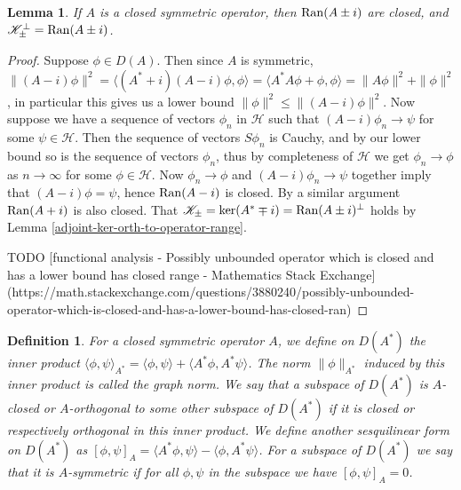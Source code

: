 \documentclass[12pt,oneside]{report}
\newtheorem{lem}[thm]{Lemma}
\newtheorem{defn}[thm]{Definition}
\begin{document}
\begin{lem}\label{RanAplusi-closed}
    If $A$ is a closed symmetric operator, then $\mathrm{Ran}(A\pm i)$ are closed, and $\mathscr{K}_{\pm}^{\perp} = \mathrm{Ran}(A\pm i)$.
\end{lem}
\begin{proof}
    Suppose $\phi \in D(A)$. Then since $A$ is symmetric, $\|(A - i)\phi\|^{2} = \langle (A^{*}+i)(A-i)\phi,\phi \rangle = \langle A^{*}A\phi + \phi, \phi \rangle = \|A\phi\|^{2} + \|\phi\|^{2}$, in particular this gives us a lower bound $\|\phi\|^{2} \leq \|(A-i)\phi\|^{2}$. Now suppose we have a sequence of vectors $\phi_{n}$ in $\mathscr{H}$ such that $(A-i)\phi_{n} \to \psi$ for some $\psi \in \mathscr{H}$. Then the sequence of vectors $S\phi_{n}$ is Cauchy, and by our lower bound so is the sequence of vectors $\phi_{n}$, thus by completeness of $\mathscr{H}$ we get $\phi_{n} \to \phi$ as $n \to \infty$ for some $\phi \in \mathscr{H}$. Now $\phi_{n} \to \phi$ and $(A-i)\phi_{n} \to \psi$ together imply that $(A-i)\phi = \psi$, hence $\mathrm{Ran}(A-i)$ is closed. By a similar argument $\mathrm{Ran}(A+i)$ is also closed. That $\mathscr{K}_{\pm} = \ker(A^{*}\mp i) = \mathrm{Ran}(A \pm i)^{\perp}$ holds by Lemma \ref{adjoint-ker-orth-to-operator-range}.
    
    TODO [functional analysis - Possibly unbounded operator which is closed and has a lower bound has closed range - Mathematics Stack Exchange](https://math.stackexchange.com/questions/3880240/possibly-unbounded-operator-which-is-closed-and-has-a-lower-bound-has-closed-ran)
\end{proof}

\begin{defn}
    For a closed symmetric operator $A$, we define on $D(A^{*})$ the inner product $\langle \phi, \psi \rangle_{A^{*}} = \langle \phi, \psi \rangle + \langle A^{*}\phi, A^{*}\psi \rangle$. The norm $\|\phi\|_{A^{*}}$ induced by this inner product is called the graph norm. We say that a subspace of $D(A^{*})$ is $A$-closed or $A$-orthogonal to some other subspace of $D(A^{*})$ if it is closed or respectively orthogonal in this inner product. We define another sesquilinear form on $D(A^{*})$ as $[\phi,\psi]_{A} = \langle A^{*}\phi, \psi \rangle - \langle \phi, A^{*} \psi \rangle$. For a subspace of $D(A^{*})$ we say that it is $A$-symmetric if for all $\phi,\psi$ in the subspace we have $[\phi,\psi]_{A} = 0$.
\end{defn}
\end{document}
